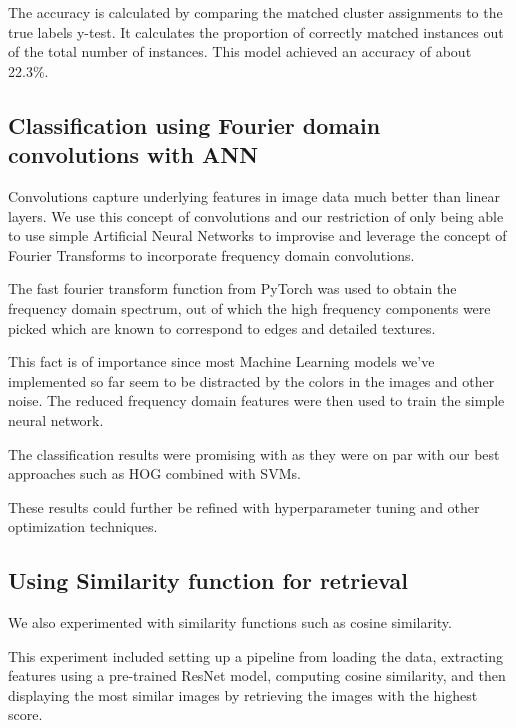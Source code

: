 \documentclass[a4paper]{article}
\theoremstyle{plain}
\theoremstyle{definition}
\begin{document}
{\begin{itemize}
The accuracy is calculated by comparing the matched cluster assignments to the true labels y-test.
It calculates the proportion of correctly matched instances out of the total number of instances.
This model achieved an accuracy of about 22.3\%.

\end{itemize}
\newpage
\subsection {Classification using Fourier domain convolutions with ANN}
Convolutions capture underlying features in image data much better than linear layers. We use this concept of convolutions and our restriction of only being able to use simple Artificial Neural Networks to improvise and leverage the concept of Fourier Transforms to incorporate frequency domain convolutions. \newline 

\noindent The fast fourier transform function from PyTorch was used to obtain the frequency domain spectrum, out of which the high frequency components were picked which are known to correspond to edges and detailed textures.\newline 

\noindent This fact is of importance since most Machine Learning models we've implemented so far seem to be distracted by the colors in the images and other noise. The reduced frequency domain features were then used to train the simple neural network. \newline

\noindent The classification results were promising with as they were on par with our best approaches such as HOG combined with SVMs. \newline

\noindent These results could further be refined with hyperparameter tuning and other optimization techniques.
\subsection {Using Similarity function for retrieval}
\noindent
We also experimented with similarity functions such as cosine similarity.\newline 

\noindent  This experiment included setting up a pipeline from loading the data, extracting features using a pre-trained ResNet model, computing cosine similarity, and then displaying the most similar images by retrieving the images with the highest score. \newline

}
\end{document}
